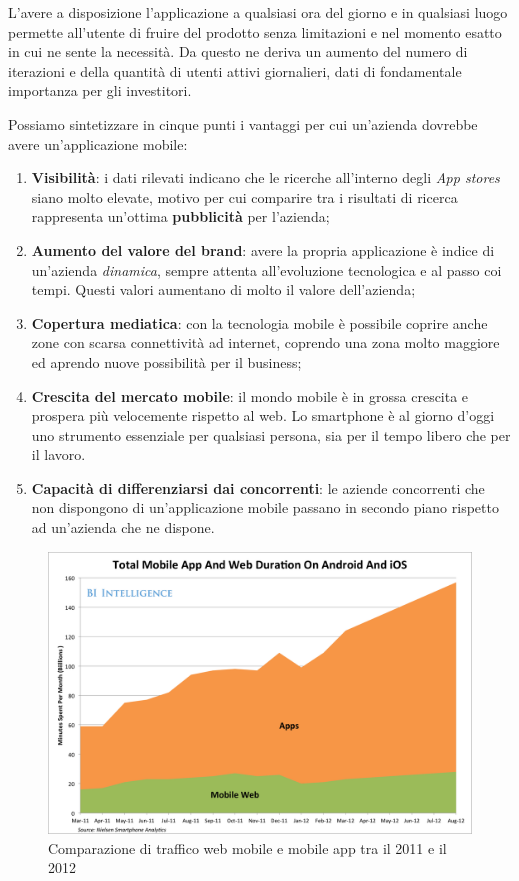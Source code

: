 L'avere a disposizione l'applicazione a qualsiasi ora del giorno e in qualsiasi luogo permette all'utente di fruire del prodotto senza limitazioni e nel momento esatto in cui ne sente la necessità. Da questo ne deriva un aumento del numero di iterazioni e della quantità di utenti attivi giornalieri, dati di fondamentale importanza per gli investitori.

Possiamo sintetizzare in cinque punti i vantaggi per cui un'azienda dovrebbe avere un'applicazione mobile:

\begin{enumerate}

\item \textbf{Visibilità}: i dati rilevati indicano che le ricerche all'interno degli \textit{App stores} siano molto elevate, motivo per cui comparire tra i risultati di ricerca rappresenta un'ottima \textbf{pubblicità} per l'azienda;
\item \textbf{Aumento del valore del brand}: avere la propria applicazione è indice di un'azienda \textit{dinamica}, sempre attenta all'evoluzione tecnologica e al passo coi tempi. Questi valori aumentano di molto il valore dell'azienda;
\item \textbf{Copertura mediatica}: con la tecnologia mobile è possibile coprire anche zone con scarsa connettività ad internet, coprendo una zona molto maggiore ed aprendo nuove possibilità per il business;
\item \textbf{Crescita del mercato mobile}: il mondo mobile è in grossa crescita e prospera più velocemente rispetto al web. Lo smartphone è al giorno d'oggi uno strumento essenziale per qualsiasi persona, sia per il tempo libero che per il lavoro.
\item \textbf{Capacità di differenziarsi dai concorrenti}: le aziende concorrenti che non dispongono di un'applicazione mobile passano in secondo piano rispetto ad un'azienda che ne dispone.

\end{enumerate}

\begin{figure}[htpd]
\centering
\includegraphics[width=\textwidth]{../immagini/mobile-and-web-market}
\caption{Comparazione di traffico web mobile e mobile app tra il 2011 e il 2012}  
\end{figure}

